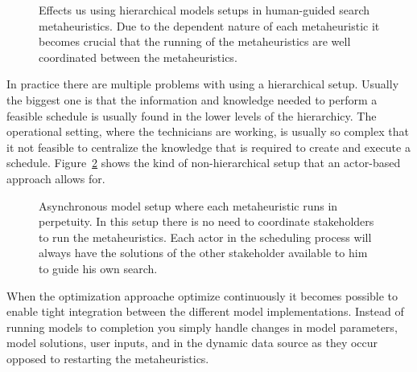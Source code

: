 \begin{figure}[H]
	
	\label{fig:discussion:hierarchical_model_setup}
	\caption{Effects us using hierarchical models setups in human-guided search metaheuristics.
	Due to the dependent nature of each metaheuristic it becomes crucial that the running of 
	the metaheuristics are well coordinated between the metaheuristics.}
\end{figure}

In practice there are multiple problems with using a hierarchical setup.
Usually the biggest one is that the information and knowledge needed to 
perform a feasible schedule is usually found in the lower levels of the 
hierarchicy. The operational setting, where the
technicians are working, is usually so complex that it not feasible to 
centralize the knowledge that is required to create and execute a 
schedule. Figure~\ref{fig:discussion:asynchronous_setup}
shows the kind of non-hierarchical setup that an actor-based approach 
allows for.

\begin{figure}[H]
	
	\caption{Asynchronous model setup where each metaheuristic runs in perpetuity. In this setup
	there is no need to coordinate stakeholders to run the metaheuristics. Each actor in the 
	scheduling process will always have the solutions of the other stakeholder available to 
	him to guide his own search.}
	\label{fig:discussion:asynchronous_setup}
\end{figure}

When the optimization approache optimize continuously it becomes possible
to enable tight integration between the different model implementations. 
Instead of running models to completion you simply handle changes in model 
parameters, model solutions, user inputs, and in the dynamic data source as 
they occur opposed to restarting the metaheuristics.

